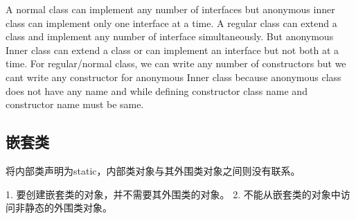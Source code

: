 A normal class can implement any number of interfaces but anonymous inner class can implement only one interface at a time.
A regular class can extend a class and implement any number of interface simultaneously. But anonymous Inner class can extend a class or can implement an interface but not both at a time.
For regular/normal class, we can write any number of constructors but we cant write any constructor for anonymous Inner class because anonymous class does not have any name and while defining constructor class name and constructor name must be same.


\subsection{嵌套类}

将内部类声明为static，内部类对象与其外围类对象之间则没有联系。

1. 要创建嵌套类的对象，并不需要其外围类的对象。
2. 不能从嵌套类的对象中访问非静态的外围类对象。



